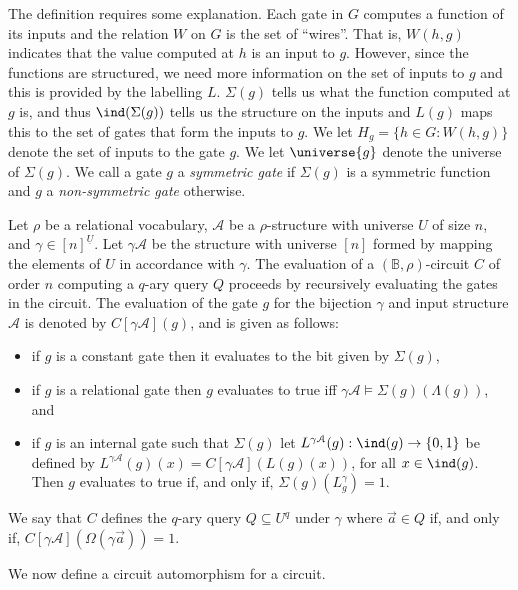 \documentclass[a4paper,UKenglish]{lipics-v2018}
\begin{document}
The definition requires some explanation. Each gate in $G$ computes a function
of its inputs and the relation $W$ on $G$ is the set of ``wires''. That is,
$W(h,g)$ indicates that the value computed at $h$ is an input to $g$. However,
since the functions are structured, we need more information on the set of
inputs to $g$ and this is provided by the labelling $L$. $\Sigma(g)$ tells us
what the function computed at $g$ is, and thus $\ind(\Sigma(g))$ tells us the
structure on the inputs and $L(g)$ maps this to the set of gates that form the
inputs to $g$. We let $H_g = \{h \in G : W(h,g)\}$ denote the set of inputs to
the gate $g$. We let $\universe{g}$ denote the universe of $\Sigma(g)$. We call
a gate $g$ a \emph{symmetric gate} if $\Sigma(g)$ is a symmetric function and
$g$ a \emph{non-symmetric gate} otherwise.

Let $\rho$ be a relational vocabulary, $\mathcal{A}$ be a $\rho$-structure with
universe $U$ of size $n$, and $\gamma \in [n]^{\underline{U}}$. Let $\gamma
\mathcal{A}$ be the structure with universe $[n]$ formed by mapping the elements
of $U$ in accordance with $\gamma$. The evaluation of a $(\mathbb{B},
\rho)$-circuit $C$ of order $n$ computing a $q$-ary query $Q$ proceeds by
recursively evaluating the gates in the circuit. The evaluation of the gate $g$
for the bijection $\gamma$ and input structure $\mathcal{A}$ is denoted by
$C[\gamma \mathcal{A}](g)$, and is given as follows:

\begin{itemize}
\item if $g$ is a constant gate then it evaluates to the bit given by
  $\Sigma(g)$,
\item if $g$ is a relational gate then $g$ evaluates to true iff $\gamma
  \mathcal{A} \models \Sigma(g)(\Lambda (g))$, and
\item if $g$ is an internal gate such that $\Sigma (g)$ let $L^{\gamma
    \mathcal{A}}(g): \ind(g) \rightarrow \{0,1\}$ be defined by
  $L^{\gamma\mathcal{A}}(g)(x) = C[\gamma \mathcal{A}](L(g)(x))$, for all $x \in
  \ind(g)$. Then $g$ evaluates to true if, and only if, $\Sigma(g)
  (L^{\gamma}_g) = 1$.
\end{itemize}

We say that $C$ defines the $q$-ary query $Q \subseteq U^q$ under $\gamma$ where
$\vec{a} \in Q$ if, and only if, $C[\gamma \mathcal{A}](\Omega (\gamma \vec{a}))
= 1$.

We now define a circuit automorphism for a circuit.
\end{document}
